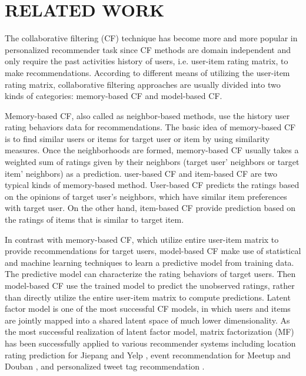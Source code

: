 \documentclass{llncs}
\begin{document}
\section{RELATED WORK}
	The collaborative filtering (CF) technique has become more and more popular in personalized recommender task\cite{2-1-1,2-1-2,2-1-3,2-1-4} since CF methods are domain independent and only require the past activities history of users,
	i.e. user-item rating matrix, to make recommendations.
	According to different means of utilizing the user-item
	rating matrix, collaborative filtering approaches are usually divided into two kinds of categories\cite{cfclass}: memory-based
	CF and model-based CF.
	
	Memory-based CF, also called as neighbor-based methods, use the history user rating behaviors data for recommendations.
	The basic idea of memory-based CF  is to find similar users or items for target user or item by using similarity measures.
	Once the neighborhoods are formed, memory-based CF usually takes a weighted sum of ratings given by their
	neighbors (target user' neighbors or target item' neighbors) as a prediction.
	user-based CF\cite{cfclass,uCF} and item-based CF\cite{iCF1,iCF2} are two typical kinds of  memory-based method.
	User-based CF predicts the ratings based on the opinions of target user's
	neighbors, which have similar item preferences with target user.
	On the other hand, item-based CF provide prediction based on the ratings of items that is similar to target item.
	
	In contrast with memory-based CF,
	which utilize entire user-item matrix to provide recommendations for target users,
	model-based CF make use of statistical and machine learning techniques to learn a predictive model from training
	data. The predictive model can characterize the rating
	behaviors of target users. Then model-based CF use the trained model to predict the unobserved ratings,
	rather than directly utilize the entire user-item matrix to compute predictions.
	Latent factor model is one of the most successful CF models, in which users and items are jointly
	mapped into a shared latent space of much lower dimensionality.
	As the most successful realization of latent factor model, matrix
	factorization (MF) \cite{SIGIR201301,KDD200801,COMPUTER2009} has been successfully applied to various recommender systems
	including location rating prediction for
	Jiepang \cite{GeoMF} and Yelp \cite{SIGIR201401}, event recommendation for Meetup\cite{event1}
	and Douban \cite{event2}, and personalized tweet tag recommendation \cite{tag}.
	
\end{document}
